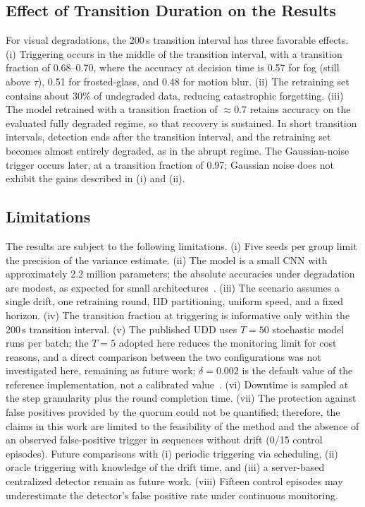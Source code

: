 \documentclass[conference]{IEEEtran}
\begin{document}
\subsection{Effect of Transition Duration on the Results}
For visual degradations, the 200\,s transition interval has three favorable effects. (i) Triggering occurs in the middle of the transition interval, with a transition fraction of 0.68--0.70, where the accuracy at decision time is 0.57 for fog (still above $\tau$), 0.51 for frosted-glass, and 0.48 for motion blur. (ii) The retraining set contains about 30\% of undegraded data, reducing catastrophic forgetting. (iii) The model retrained with a transition fraction of $\approx$0.7 retains accuracy on the evaluated fully degraded regime, so that recovery is sustained. In short transition intervals, detection ends after the transition interval, and the retraining set becomes almost entirely degraded, as in the abrupt regime. The Gaussian-noise trigger occurs later, at a transition fraction of 0.97; Gaussian noise does not exhibit the gains described in (i) and (ii).

\subsection{Limitations}
The results are subject to the following limitations. (i) Five seeds per group limit the precision of the variance estimate. (ii) The model is a small CNN with approximately 2.2 million parameters; the absolute accuracies under degradation are modest, as expected for small architectures~\cite{hendrycks2019}. (iii) The scenario assumes a single drift, one retraining round, IID partitioning, uniform speed, and a fixed horizon. (iv) The transition fraction at triggering is informative only within the 200\,s transition interval. (v) The published UDD uses $T=50$ stochastic model runs per batch; the $T=5$ adopted here reduces the monitoring limit for cost reasons, and a direct comparison between the two configurations was not investigated here, remaining as future work; $\delta=0.002$ is the default value of the reference implementation, not a calibrated value~\cite{baier2023,poenaru2022}. (vi) Downtime is sampled at the step granularity plus the round completion time. (vii) The protection against false positives provided by the quorum could not be quantified; therefore, the claims in this work are limited to the feasibility of the method and the absence of an observed false-positive trigger in sequences without drift (0/15 control episodes). Future comparisons with (i) periodic triggering via scheduling, (ii) oracle triggering with knowledge of the drift time, and (iii) a server-based centralized detector remain as future work. (viii) Fifteen control episodes may underestimate the detector’s false positive rate under continuous monitoring.
\end{document}
